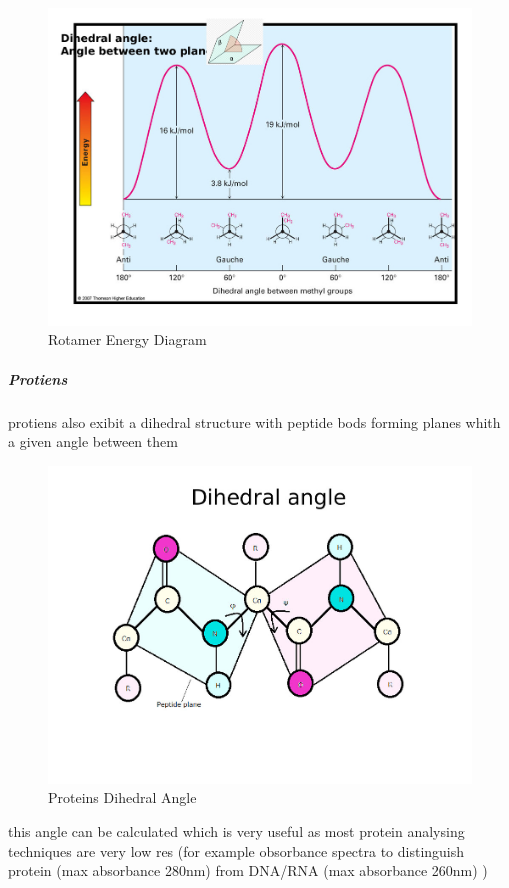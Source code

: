 \documentclass[]{article}
\let\oldsubparagraph\subparagraph
\renewcommand{\subparagraph}[1]{\oldsubparagraph{#1}\mbox{}}
\begin{document}
\begin{figure}
\centering
\includegraphics{Images/RotamerEnergyDiagram.jpg}
\caption{Rotamer Energy Diagram}
\end{figure}

\hypertarget{protiens}{%
\subparagraph{Protiens}\label{protiens}}

protiens also exibit a dihedral structure with peptide bods forming
planes whith a given angle between them

\begin{figure}
\centering
\includegraphics{Images/DihedralAngle.jpg}
\caption{Proteins Dihedral Angle}
\end{figure}

this angle can be calculated which is very useful as most protein
analysing techniques are very low res (for example obsorbance spectra to
distinguish protein (max absorbance 280nm) from DNA/RNA (max absorbance
260nm) )
\end{document}
